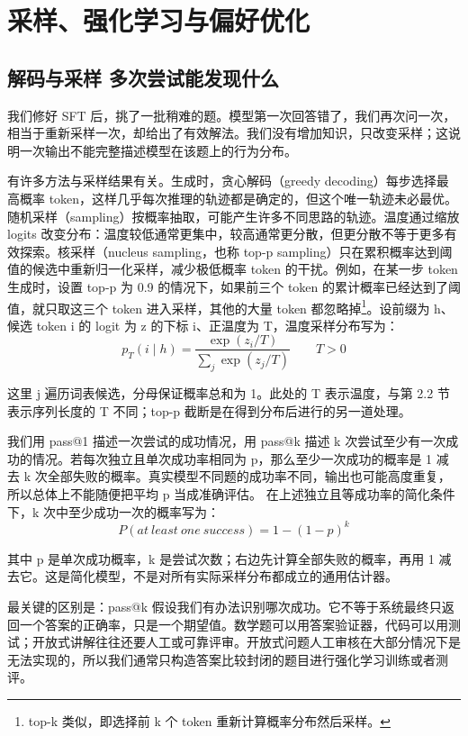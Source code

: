 \chapter{采样、强化学习与偏好优化}\label{采样与强化学习}

\section{解码与采样 多次尝试能发现什么}\label{解码与采样 多次尝试能发现什么}

我们修好 SFT 后，挑了一批稍难的题。模型第一次回答错了，我们再次问一次，相当于重新采样一次，却给出了有效解法。我们没有增加知识，只改变采样；这说明一次输出不能完整描述模型在该题上的行为分布。

有许多方法与采样结果有关。生成时，贪心解码（greedy decoding）每步选择最高概率 token，这样几乎每次推理的轨迹都是确定的，但这个唯一轨迹未必最优。随机采样（sampling）按概率抽取，可能产生许多不同思路的轨迹。温度通过缩放 logits 改变分布：温度较低通常更集中，较高通常更分散，但更分散不等于更多有效探索。核采样（nucleus sampling，也称 top-p sampling）只在累积概率达到阈值的候选中重新归一化采样，减少极低概率 token 的干扰。例如，在某一步 token 生成时，设置 top-p 为 0.9 的情况下，如果前三个 token 的累计概率已经达到了阈值，就只取这三个 token 进入采样，其他的大量 token 都忽略掉\footnote{top-k 类似，即选择前 k 个 token 重新计算概率分布然后采样。}。设前缀为 h、候选 token i 的 logit 为 z 的下标 i、正温度为 T，温度采样分布写为：
\[p_{T}(i \mid h) = \frac{\exp\left( z_{i}/T \right)}{\sum_{j}^{}\exp\left( z_{j}/T \right)}\quad\quad T > 0\]

这里 j 遍历词表候选，分母保证概率总和为 1。此处的 T 表示温度，与第 2.2 节表示序列长度的 T 不同；top-p 截断是在得到分布后进行的另一道处理。

我们用 pass@1 描述一次尝试的成功情况，用 pass@k 描述 k 次尝试至少有一次成功的情况。若每次独立且单次成功率相同为 p，那么至少一次成功的概率是 1 减去 k 次全部失败的概率。真实模型不同题的成功率不同，输出也可能高度重复，所以总体上不能随便把平均 p 当成准确评估。 在上述独立且等成功率的简化条件下，k 次中至少成功一次的概率写为：
\[P(at\ least\ one\ success) = 1 - (1 - p)^{k}\]

其中 p 是单次成功概率，k 是尝试次数；右边先计算全部失败的概率，再用 1 减去它。这是简化模型，不是对所有实际采样分布都成立的通用估计器。

最关键的区别是：pass@k 假设我们有办法识别哪次成功。它不等于系统最终只返回一个答案的正确率，只是一个期望值。数学题可以用答案验证器，代码可以用测试；开放式讲解往往还要人工或可靠评审。开放式问题人工审核在大部分情况下是无法实现的，所以我们通常只构造答案比较封闭的题目进行强化学习训练或者测评。

